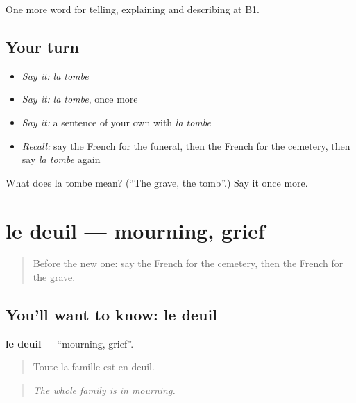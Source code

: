 \begin{grammarlens}[title={What you've built}]
One more word for telling, explaining and describing at B1.
\end{grammarlens}

\subsection*{Your turn}
\begin{itemize}
\raggedright
  \item \emph{Say it:} \emph{la tombe}
  \item \emph{Say it:} \emph{la tombe}, once more
  \item \emph{Say it:} a sentence of your own with \emph{la tombe}
  \item \emph{Recall:} say the French for the funeral, then the French for the cemetery, then say \emph{la tombe} again
\end{itemize}

\begin{tcolorbox}[breakable,colback=teal!4,colframe=teal!35!black,title={Before you move on}]
What does la tombe mean? (\textquotedblleft{}The grave, the tomb\textquotedblright{}.) Say it once more.
\end{tcolorbox}
\section[le deuil]{le deuil — mourning, grief}

\label{lesson:FR-C315-deuil}



\begin{quote}
Before the new one: say the French for the cemetery, then the French for the grave.
\end{quote}

\subsection*{You'll want to know: le deuil}
\textbf{le deuil} — \textquotedblleft{}mourning, grief\textquotedblright{}.

\begin{quote}
Toute la famille est en deuil.
\end{quote}

\begin{quote}
\emph{The whole family is in mourning.}
\end{quote}

